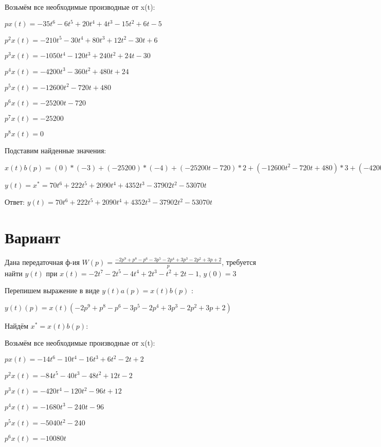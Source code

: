\documentclass{article}
\begin{document}
{{{{Возьмём все необходимые производные от x(t):

$px(t)=-35t^{6}-6t^{5}+20t^{4}+4t^{3}-15t^{2}+6t-5$

$p^2x(t)=-210t^{5}-30t^{4}+80t^{3}+12t^{2}-30t+6$

$p^3x(t)=-1050t^{4}-120t^{3}+240t^{2}+24t-30$

$p^4x(t)=-4200t^{3}-360t^{2}+480t+24$

$p^5x(t)=-12600t^{2}-720t+480$

$p^6x(t)=-25200t-720$

$p^7x(t)=-25200$

$p^8x(t)=0$

Подставим найденные значения:

$x(t)b(p) = (0)*(-3)+(-25200)*(-4)+(-25200t-720)*2+(-12600t^{2}-720t+480)*3+(-4200t^{3}-360t^{2}+480t+24)*(-1)+(-1050t^{4}-120t^{3}+240t^{2}+24t-30)*(-2)+(-210t^{5}-30t^{4}+80t^{3}+12t^{2}-30t+6)*(-1)+(-35t^{6}-6t^{5}+20t^{4}+4t^{3}-15t^{2}+6t-5)*(-2)+=70t^{6}+222t^{5}+2090t^{4}+4352t^{3}-37902t^{2}-53070t$





$y(t)=x^*=70t^{6}+222t^{5}+2090t^{4}+4352t^{3}-37902t^{2}-53070t$

Ответ: $y(t) = 70t^{6}+222t^{5}+2090t^{4}+4352t^{3}-37902t^{2}-53070t$

\section{Вариант}

Дана передаточная ф-ия $W(p)=\frac{-2p^{9}+p^{8}-p^{6}-3p^{5}-2p^{4}+3p^{3}-2p^{2}+3p+2}{p}$, требуется найти $y(t)$ при $x(t)=-2t^{7}-2t^{5}-4t^{4}+2t^{3}-t^{2}+2t-1$, $y(0)=3$

Перепишем выражение в виде $y(t)a(p)=x(t)b(p)$ :

$y(t)(p)=x(t)(-2p^{9}+p^{8}-p^{6}-3p^{5}-2p^{4}+3p^{3}-2p^{2}+3p+2)$

Найдём $x^*=x(t)b(p)$:

Возьмём все необходимые производные от x(t):

$px(t)=-14t^{6}-10t^{4}-16t^{3}+6t^{2}-2t+2$

$p^2x(t)=-84t^{5}-40t^{3}-48t^{2}+12t-2$

$p^3x(t)=-420t^{4}-120t^{2}-96t+12$

$p^4x(t)=-1680t^{3}-240t-96$

$p^5x(t)=-5040t^{2}-240$

$p^6x(t)=-10080t$

}}}}
\end{document}
